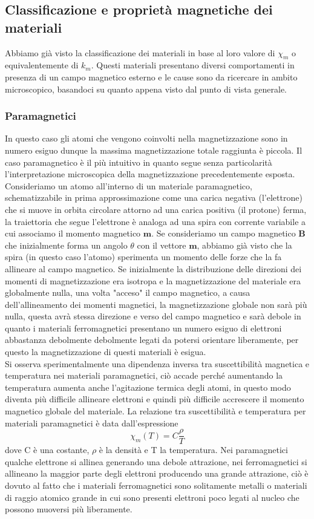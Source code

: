 \documentclass[
10pt, %
a4paper, %
oneside, %
headinclude,footinclude, %
BCOR5mm, %
]{scrartcl}
\begin{document}
\subsection{Classificazione e proprietà magnetiche dei materiali}
Abbiamo già visto la classificazione dei materiali in base al loro valore di $\chi_m$ o equivalentemente di \(k_m\). Questi materiali presentano diversi comportamenti in presenza di un campo magnetico esterno e le cause sono da ricercare in ambito microscopico, basandoci su quanto appena visto dal punto di vista generale.
\subsubsection{Paramagnetici}
In questo caso gli atomi che vengono coinvolti nella magnetizzazione sono in numero esiguo dunque la massima magnetizzazione totale raggiunta è piccola.
Il caso paramagnetico è il più intuitivo in quanto segue senza particolarità l'interpretazione microscopica della magnetizzazione precedentemente esposta.\\ 
Consideriamo un atomo all'interno di un materiale paramagnetico, schematizzabile in prima approssimazione come una carica negativa (l'elettrone) che si muove in orbita circolare attorno ad una carica positiva (il protone) ferma, la traiettoria che segue l'elettrone è analoga ad una spira con corrente variabile a cui associamo il momento magnetico \(\mathbf{m}\). Se consideriamo un campo magnetico \(\mathbf{B}\) che inizialmente forma un angolo $\theta$ con il vettore \(\mathbf{m}\), abbiamo già visto che la spira (in questo caso l'atomo) sperimenta un momento delle forze che la fa allineare al campo magnetico. Se inizialmente la distribuzione delle direzioni dei momenti di magnetizzazione era isotropa e la magnetizzazione del materiale era globalmente nulla, una volta "acceso" il campo magnetico, a causa dell'allineamento dei momenti magnetici, la magnetizzazione globale non sarà più nulla, questa avrà stessa direzione e verso del campo magnetico e sarà debole in quanto i materiali ferromagnetici presentano un numero esiguo di elettroni abbastanza debolmente debolmente legati da potersi orientare liberamente, per questo la magnetizzazione di questi materiali è esigua.\\
Si osserva sperimentalmente una dipendenza inversa tra suscettibilità magnetica e temperatura nei materiali paramagnetici, ciò accade perché aumentando la temperatura aumenta anche l'agitazione termica degli atomi, in questo modo diventa più difficile allineare elettroni e quindi più difficile accrescere il momento magnetico globale del materiale.
La relazione tra suscettibilità e temperatura per materiali paramagnetici è data dall'espressione
\[\chi_m (T) = C \frac{\rho}{T}\]
dove C è una costante, $\rho$ è la densità e T la temperatura. Nei paramagnetici qualche elettrone si allinea generando una debole attrazione, nei ferromagnetici si allineano la maggior parte degli elettroni producendo una grande attrazione, ciò è dovuto al fatto che i materiali ferromagnetici sono solitamente metalli o materiali di raggio atomico grande in cui sono presenti elettroni poco legati al nucleo che possono muoversi più liberamente. 
\end{document}
